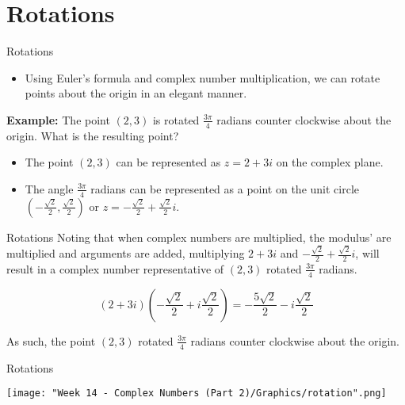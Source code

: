 \documentclass{beamer}
\begin{document}
\section{Rotations}
\begin{frame}{Rotations}
\begin{itemize}
    \item Using Euler's formula and complex number multiplication, we can rotate points about the origin in an elegant manner.
\end{itemize}

\textbf{Example:} The point $(2, 3)$ is rotated $\frac{3\pi}{4}$ radians counter clockwise about the origin. What is the resulting point? 
\begin{itemize}
    \item The point $(2, 3)$ can be represented as $z = 2 + 3i$ on the complex plane.
    \item The angle $\frac{3\pi}{4}$ radians can be represented as a point on the unit circle $(-\frac{\sqrt{2}}{2}, \frac{\sqrt{2}}{2})$ or $z = -\frac{\sqrt{2}}{2} + \frac{\sqrt{2}}{2}i$. 
\end{itemize}
\end{frame}

\begin{frame}{Rotations}
    Noting that when complex numbers are multiplied, the modulus' are multiplied and arguments are added, multiplying $2 + 3i$ and $-\frac{\sqrt{2}}{2} + \frac{\sqrt{2}}{2}i$, will result in a complex number representative of $(2, 3)$ rotated $\frac{3\pi}{4}$ radians.
    
    \begin{equation*}
        (2 + 3i)(-\frac{\sqrt{2}}{2} + i\frac{\sqrt{2}}{2}) = -\frac{5\sqrt{2}}{2} - i\frac{\sqrt{2}}{2}
    \end{equation*}
    
    As such, the point $(2, 3)$ rotated $\frac{3\pi}{4}$ radians counter clockwise about the origin.
\end{frame}

\begin{frame}{Rotations}
\begin{center}
    \texttt{[image: "Week 14 - Complex Numbers (Part 2)/Graphics/rotation".png]}
\end{center}
\end{frame}
\end{document}
